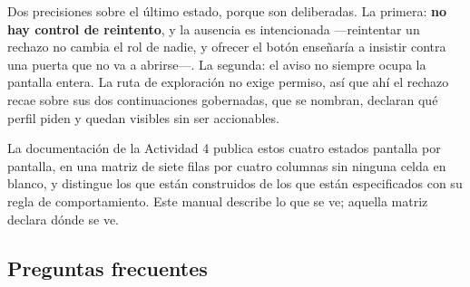 Dos precisiones sobre el último estado, porque son deliberadas. La primera: \textbf{no hay control
de reintento}, y la ausencia es intencionada ---reintentar un rechazo no cambia el rol de nadie, y
ofrecer el botón enseñaría a insistir contra una puerta que no va a abrirse---. La segunda: el
aviso no siempre ocupa la pantalla entera. La ruta de exploración no exige permiso, así que ahí el
rechazo recae sobre sus dos continuaciones gobernadas, que se nombran, declaran qué perfil piden y
quedan visibles sin ser accionables.

La documentación de la Actividad 4 publica estos cuatro estados pantalla por pantalla, en una
matriz de siete filas por cuatro columnas sin ninguna celda en blanco, y distingue los que están
construidos de los que están especificados con su regla de comportamiento. Este manual describe lo
que se ve; aquella matriz declara dónde se ve.

\clearpage
\subsection{Preguntas frecuentes}

